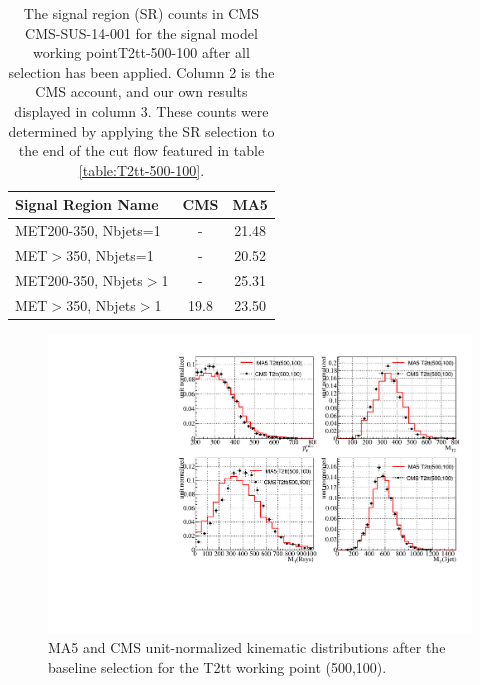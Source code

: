     \begin{table}
    \begin{centering}
    \begin{tabular}{  l | c | c  }
    \hline
        \hline
    Signal Region Name & CMS & MA5\\
    \hline
    MET200-350,  Nbjets=1 & - & 21.48\\ 
 \hline 
MET$>$350,  Nbjets=1 & - & 20.52\\ 
 \hline 
MET200-350,  Nbjets$>$1 & - & 25.31\\ 
 \hline 
MET$>$350,  Nbjets$>$1 & 19.8 & 23.50\\ 
 \hline 
\hline
    \end{tabular}
    \caption{The signal region (SR) counts in CMS CMS-SUS-14-001 for
    the signal model working pointT2tt-500-100 after all selection has been applied. Column 2 is the CMS account,
    and our own results displayed in column 3. These counts were determined by applying the SR selection to the end of the cut flow featured in table \ref{table:T2tt-500-100}.}
    \end{centering}
    \end{table}
    
   \begin{figure}
  \caption{MA5 and CMS unit-normalized kinematic distributions after the baseline
    selection for the T2tt working point (500,100).}
  \centering
    \includegraphics[width=\textwidth]{figures/Appendices/Ma5ValidationSUS13012/T2tt-500-100.pdf}
\end{figure}



